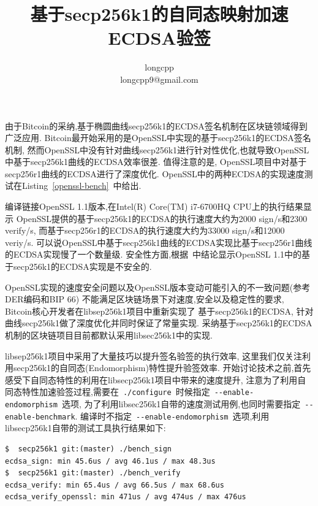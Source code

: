 \documentclass{article}
\newcommand{\code}[1]{\lstinline!#1!}
\begin{document}
\title{基于secp256k1的自同态映射加速ECDSA验签}
\author{longcpp \\ longcpp9@gmail.com}

\maketitle

由于Bitcoin的采纳,基于椭圆曲线secp256k1的ECDSA签名机制在区块链领域得到广泛应用.
Bitcoin最开始采用的是OpenSSL中实现的基于secp256k1的ECDSA签名机制,
然而OpenSSL中没有针对曲线secp256k1进行针对性优化,也就导致OpenSSL中基于secp256k1曲线的ECDSA效率很差.
值得注意的是, OpenSSL项目中对基于secp256r1曲线的ECDSA进行了深度优化.
OpenSSL中的两种ECDSA的实现速度测试在Listing~\ref{openssl-bench}~中给出.



编译链接OpenSSL 1.1版本,在Intel(R) Core(TM) i7-6700HQ CPU上的执行结果显示
OpenSSL提供的基于secp256k1的ECDSA的执行速度大约为2000  sign/s和2300 verify/s,
而基于secp256r1的ECDSA的执行速度大约为33000 sign/s和12000 veriy/s.
可以说OpenSSL中基于secp256k1曲线的ECDSA实现比基于secp256r1曲线的ECDSA实现慢了一个数量级.
安全性方面,根据~\cite{ecdsa-side-channel}中结论显示OpenSSL 1.1中的基于secp256k1的ECDSA实现是不安全的.

OpenSSL实现的速度安全问题以及OpenSSL版本变动可能引入的不一致问题(参考DER编码和BIP 66)
不能满足区块链场景下对速度,安全以及稳定性的要求, Bitcoin核心开发者在libsep256k1项目中重新实现了
基于secp256k1的ECDSA, 针对曲线secp256k1做了深度优化并同时保证了常量实现.
采纳基于secp256k1的ECDSA机制的区块链项目目前都默认采用libsec256k1中的实现.

libsep256k1项目中采用了大量技巧以提升签名验签的执行效率,
这里我们仅关注利用secp256k1的自同态(Endomorphism)特性提升验签效率.
开始讨论技术之前,首先感受下自同态特性的利用在libsecp256k1项目中带来的速度提升,
注意为了利用自同态特性加速验签过程,需要在~\code{./configure}~时候指定~\code{--enable-endomorphism}~选项,
为了利用libsec256k1自带的速度测试用例,也同时需要指定~\code{--enable-benchmark}.
编译时不指定~\code{--enable-endomorphism}~选项,利用libsecp256k1自带的测试工具执行结果如下:

\begin{lstlisting}[caption=\texttt{libsecp256k1 benchmark without --enable-endomorphism}]
$  secp256k1 git:(master) ./bench_sign
ecdsa_sign: min 45.6us / avg 46.1us / max 48.3us
$  secp256k1 git:(master) ./bench_verify 
ecdsa_verify: min 65.4us / avg 66.5us / max 68.6us
ecdsa_verify_openssl: min 471us / avg 474us / max 476us
\end{lstlisting}
\end{document}
